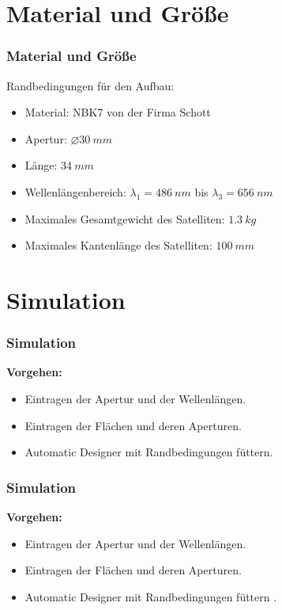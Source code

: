 \documentclass{beamer}
\begin{document}
\section{Material und Größe}
\begin{frame}
	\frametitle{Material und Größe}
	Randbedingungen für den Aufbau:
		\begin{itemize}
		\item  Material: NBK7 von der Firma Schott \pause
		\item Apertur: $\varnothing 30 ~mm$ \pause
		\item Länge: $ 34 ~mm$ \pause
		\item Wellenlängenbereich: $\lambda_1 = 486~nm $ bis $ \lambda_3=656 ~nm$ \pause
		\item Maximales Gesamtgewicht des  Satelliten: $ 1.3 ~kg$ \pause
		\item Maximales Kantenlänge des  Satelliten: $ 100 ~mm$ 
	\end{itemize}
\end{frame}


\section{Simulation}

\begin{frame}\frametitle{Simulation}
	\textbf{Vorgehen:}
	\begin{itemize}
		\item Eintragen der Apertur und der Wellenlängen. \pause
		\item Eintragen der Flächen und deren Aperturen. \pause
		\item Automatic Designer mit Randbedingungen \glqq füttern\grqq. \pause 
	\end{itemize}

\end{frame}

\begin{frame}\frametitle{Simulation}
\textbf{Vorgehen:}
	\begin{itemize}
		\item Eintragen der Apertur und der Wellenlängen. 
		\item Eintragen der Flächen und deren Aperturen. 
		\item Automatic Designer mit Randbedingungen \glqq füttern \grqq. 
	\end{itemize}

\end{frame}
\end{document}
